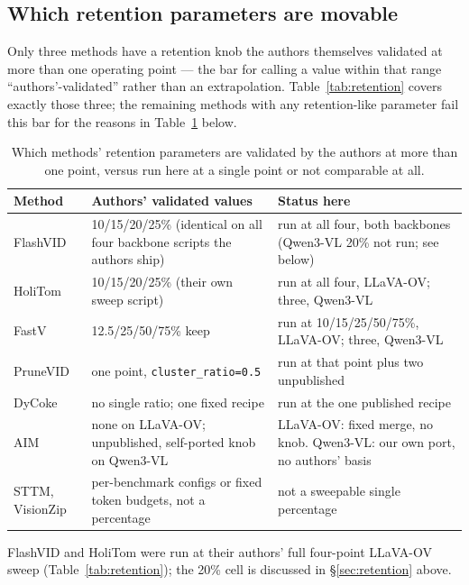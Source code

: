 \documentclass[11pt]{article}
\begin{document}
\subsection{Which retention parameters are movable}
\label{sec:movable}

Only three methods have a retention knob the authors themselves validated at
more than one operating point --- the bar for calling a value within that
range ``authors'-validated'' rather than an extrapolation. Table~\ref{tab:retention}
covers exactly those three; the remaining methods with any retention-like
parameter fail this bar for the reasons in Table~\ref{tab:movable} below.

\begin{table}[H]
  \centering
  \small
  \caption{Which methods' retention parameters are validated by the authors
  at more than one point, versus run here at a single point or not
  comparable at all.}
  \label{tab:movable}
  \begin{tabular}{p{2.4cm}p{6.0cm}p{6.0cm}}
    \toprule
    Method & Authors' validated values & Status here \\
    \midrule
    FlashVID & 10/15/20/25\% (identical on all four backbone scripts the authors ship) & run at all four, both backbones (Qwen3-VL 20\% not run; see below) \\
    HoliTom & 10/15/20/25\% (their own sweep script) & run at all four, LLaVA-OV; three, Qwen3-VL \\
    FastV & 12.5/25/50/75\% keep & run at 10/15/25/50/75\%, LLaVA-OV; three, Qwen3-VL \\
    \midrule
    PruneVID & one point, \texttt{cluster\_ratio=0.5} & run at that point plus two unpublished \\
    DyCoke & no single ratio; one fixed recipe & run at the one published recipe \\
    AIM & none on LLaVA-OV; unpublished, self-ported knob on Qwen3-VL & LLaVA-OV: fixed merge, no knob. Qwen3-VL: our own port, no authors' basis \\
    STTM, VisionZip & per-benchmark configs or fixed token budgets, not a percentage & not a sweepable single percentage \\
    \bottomrule
  \end{tabular}
\end{table}

FlashVID and HoliTom were run at their authors' full four-point LLaVA-OV
sweep (Table~\ref{tab:retention}); the 20\% cell is discussed in
\S\ref{sec:retention} above.
\end{document}
